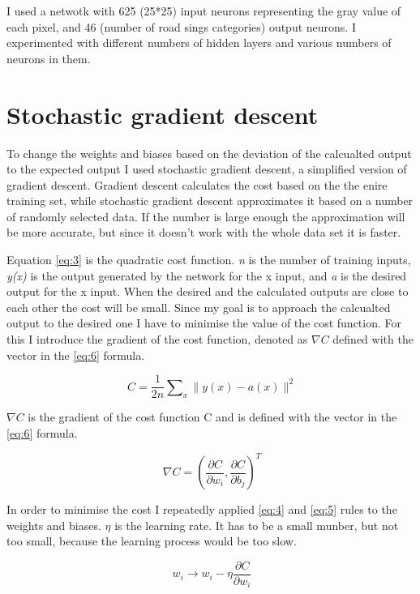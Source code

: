 I used a netwotk with 625 (25*25) input neurons representing the gray value of each pixel, and 46 (number of road sings categories) output neurons. I experimented with different numbers of hidden layers and various numbers of neurons in them.


\section{Stochastic gradient descent}\label{sec:INTRO:graddesc}

To change the weights and biases based on the deviation of the calcualted output to the expected output I used stochastic gradient descent, a simplified version of gradient descent. Gradient descent calculates the cost based on the the enire training set, while stochastic gradient descent approximates it based on a number of randomly selected data. If the number is large enough the approximation will be more accurate, but since it doesn't work with the whole data set it is faster.

Equation \ref{eq:3} is the quadratic cost function. \textit{n} is the number of training inputs, \textit{y(x)} is the output generated by the network for the x input, and \textit{a} is the desired output for the x input. When the desired and the calculated outputs are close to each other the cost will be small. Since my goal is to approach the calcualted output to the desired one I have to minimise the value of the cost function. For this I introduce the gradient of the cost function, denoted as $\nabla C$ defined with the vector in the \ref{eq:6} formula. \cite{DUMMY:1}

\begin{equation} \label{eq:3}
\ C = \frac{1}{2n}\sum\nolimits_{x} \|y(x)-a(x)\|^2
\end{equation}

$\nabla C$ is the gradient of the cost function C and is defined with the vector in the \ref{eq:6} formula. 

\begin{equation} \label{eq:6}
\ \nabla C = (\frac{\partial C}{\partial w_{i}},\frac{\partial C}{\partial b_{j}})^T
\end{equation}

In order to minimise the cost I repeatedly applied \ref{eq:4} and \ref{eq:5} rules to the weights and biases. $\eta$ is the learning rate. It has to be a small munber, but not too small, because the learning process would be too slow.

\begin{equation} \label{eq:4}
\ w_{i} \rightarrow w_{i} - \eta\frac{\partial C}{\partial w_{i}} 
\end{equation}

